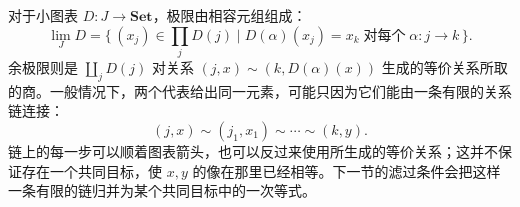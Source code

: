 \begin{example}[集合极限与余极限的统一公式]\label{b4:exm:set-limit-formulas}
	对于小图表 \(D:J\rightarrow\mathbf{Set}\)，极限由相容元组组成：
	\[
		\lim_JD =\{\,(x_j)\in\prod_jD(j)\mid D(\alpha)(x_j)=x_k\;\text{对每个}\;\alpha:j\rightarrow k\,\}.
	\]
	余极限则是 \(\coprod_jD(j)\) 对关系 \((j,x)\sim(k,D(\alpha)(x))\) 生成的等价关系所取的商。一般情况下，两个代表给出同一元素，可能只因为它们能由一条有限的关系链连接：
	\[
		(j,x)\sim(j_1,x_1)\sim\cdots\sim(k,y).
	\]
	链上的每一步可以顺着图表箭头，也可以反过来使用所生成的等价关系；这并不保证存在一个共同目标，使 \(x,y\) 的像在那里已经相等。下一节的滤过条件会把这样一条有限的链归并为某个共同目标中的一次等式。
\end{example}
